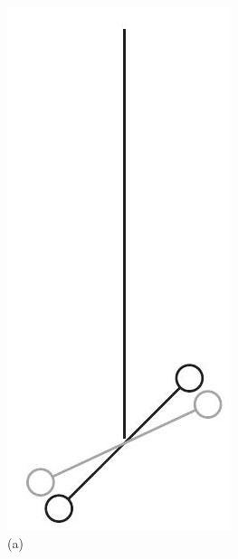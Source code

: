 \documentclass[10pt]{article}
\begin{document}
\includegraphics[max width=\textwidth, center]{2024_09_14_9969b06773f10b6936e8g-292(1)}\\
(a)
\end{document}
